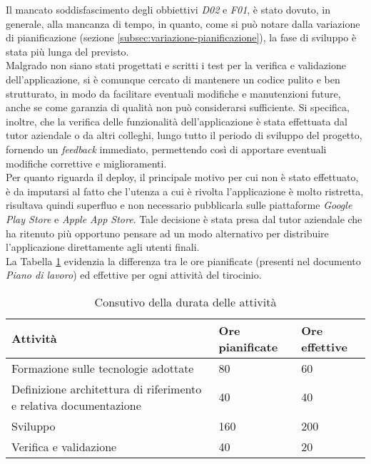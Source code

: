 \noindent Il mancato soddisfascimento degli obbiettivi \emph{D02} e \emph{F01}, è stato dovuto, in generale, alla mancanza di tempo, in quanto, come si può notare dalla variazione di pianificazione (sezione \ref{subsec:variazione-pianificazione}), la fase di sviluppo è stata più lunga del previsto.\\
Malgrado non siano stati progettati e scritti i test per la verifica e validazione dell'applicazione, si è comunque cercato di mantenere un codice pulito e ben strutturato, in modo da facilitare eventuali modifiche e manutenzioni future, anche se come garanzia di qualità non può considerarsi sufficiente.
Si specifica, inoltre, che la verifica delle funzionalità dell'applicazione è stata effettuata dal tutor aziendale o da altri colleghi, lungo tutto il periodo di sviluppo del progetto, fornendo un \emph{feedback} immediato, permettendo così di apportare eventuali modifiche correttive e miglioramenti.\\
Per quanto riguarda il \gls{deploy}\glsoccur, il principale motivo per cui non è stato effettuato, è da imputarsi al fatto che l'utenza a cui è rivolta l'applicazione è molto ristretta, risultava quindi superfluo e non necessario pubblicarla sulle piattaforme \emph{Google Play Store} e \emph{Apple App Store}. Tale decisione è stata presa dal tutor aziendale che ha ritenuto più opportuno pensare ad un modo alternativo per distribuire l'applicazione direttamente agli utenti finali.\\
La Tabella \ref{tab:ore-pianificate-effettive} evidenzia la differenza tra le ore pianificate (presenti nel documento \emph{Piano di lavoro}) ed effettive per ogni attività del tirocinio.

\begin{table}
    \centering
    \begin{tabular}{|l|l|l|}
        \hline
        \textbf{Attività} & \textbf{Ore pianificate} & \textbf{Ore effettive} \\ \hline
        Formazione sulle tecnologie adottate                & 80      & 60    \\ \hline
        Definizione architettura di riferimento e relativa documentazione                & 40      & 40    \\ \hline
        Sviluppo                & 160      & 200    \\ \hline
        Verifica e validazione                & 40      & 20    \\ \hline
    \end{tabular}%
\caption{Consutivo della durata delle attività}
\label{tab:ore-pianificate-effettive}
\end{table}


